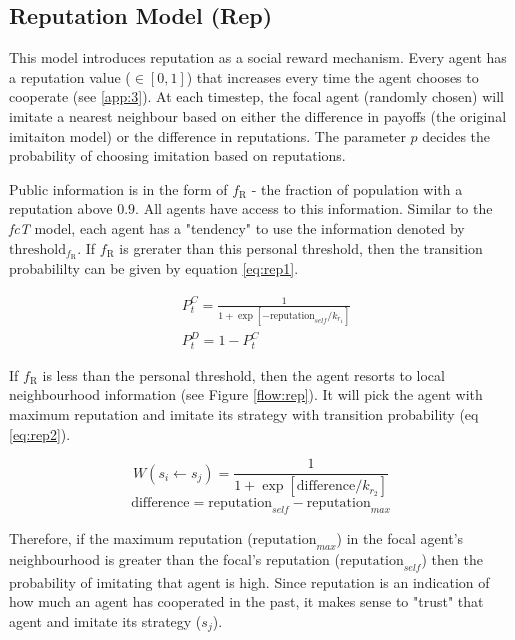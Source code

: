 \documentclass[11pt, A4 paper, twocolumn ]{article}
\newcommand{\fr}{$ f_{\text{R}} $}
\newcommand{\frm}{f_{\text{R}}}
\begin{document}
	\subsection{Reputation Model (Rep)}
	This model introduces reputation as a social reward mechanism. Every agent has a reputation value ($ \in  [0,1]$) that increases every time the agent chooses to cooperate (see \ref{app:3}). At each timestep, the focal agent (randomly chosen) will imitate a nearest neighbour based on either the difference in payoffs (the original imitaiton model) or the difference in reputations. The parameter $ p $ decides the probability of choosing imitation based on reputations. \par 
	Public information is in the form of \fr{} - the fraction of population with a reputation above $ 0.9 $. All agents have access to this information. Similar to the \textit{fcT} model, each agent has a "tendency" to use the information denoted by $ \text{threshold}_{\frm} $. If \fr{} is grerater than this personal threshold, then the transition probabililty can be given by equation \ref{eq:rep1}.
	
	\begin{equation} \label{eq:rep1}
		\begin{split}
			&P_{t}^{C} = 	\frac{1}{1 + \exp[-\text{reputation}_{\textit{self}}/k_{r_{1}}]} \\
			&P_{t}^{D} = 1- P_{t}^{C}
		\end{split}
	\end{equation}

	If \fr{} is less than the personal threshold, then the agent resorts to local neighbourhood information (see Figure \ref{flow:rep}). It will pick the agent with maximum reputation  and imitate its strategy with transition probability (eq \ref{eq:rep2}).
	
	\begin{equation}\label{eq:rep2}
		W(s_{i} \leftarrow s_{j}) = \frac{1}{1 + \exp[\text{difference}/k_{r_{2}}]}
	\end{equation}
	\begin{equation*}
	\text{difference} = \text{reputation}_{\textit{self}} - \text{reputation}_{\textit{max}}
	\end{equation*}

	Therefore, if the maximum reputation ($ \text{reputation}_{\textit{max}} $) in the focal agent's neighbourhood is greater than the focal's reputation ($ \text{reputation}_{\textit{self}} $) then the probability of imitating that agent is high. Since reputation is an indication of how much an agent has cooperated in the past, it makes sense to "trust" that agent and imitate its strategy ($ s_{j} $). 
	
\end{document}
